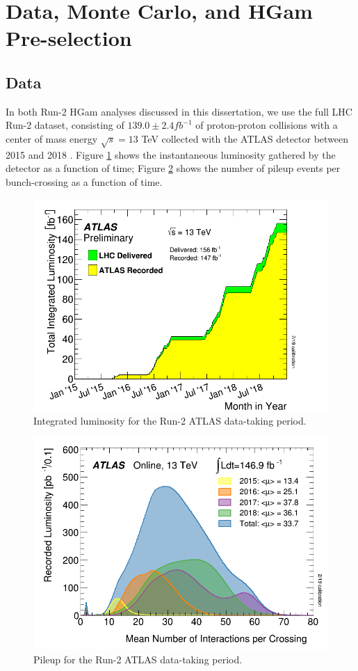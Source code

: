 \section{Data, Monte Carlo, and HGam Pre-selection} \label{sec:DataMC}

\subsection{Data} \label{sec:Data}

In both Run-2 HGam analyses discussed in this dissertation, we use the full LHC Run-2 dataset, consisting of $139.0 \pm 2.4 fb^{-1}$ of proton-proton collisions with a center of mass energy $\sqrt{s} = 13$ TeV collected with the ATLAS detector between 2015 and 2018 \cite{ATLAS-CONF-2019-021}. Figure \ref{fig:datalumi} shows the instantaneous luminosity gathered by the detector as a function of time; Figure \ref{fig:pileup} shows the number of pileup events per bunch-crossing as a function of time. 

\begin{figure}
\centering
\includegraphics[width=0.5\linewidth]{figures/datamc_chapter/datalumi.png}
\caption{Integrated luminosity for the Run-2 ATLAS data-taking period.}
\label{fig:datalumi}
\end{figure}

\begin{figure}
\centering
\includegraphics[width=0.5\linewidth]{figures/datamc_chapter/pileup.png}
\caption{Pileup for the Run-2 ATLAS data-taking period.}
\label{fig:pileup}
\end{figure}

